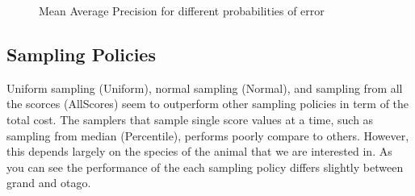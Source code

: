 \begin{figure}[h]
  \centering
  \caption{Mean Average Precision for different probabilities of error}
  \label{fig:overview}
\end{figure}


\subsection{Sampling Policies} %
\label{sub:sampling_policies_res}

Uniform sampling (Uniform), normal sampling (Normal), and sampling from all the scorces (AllScores) seem to outperform other sampling policies in term of the total cost. The samplers that sample single score values at a time, such as sampling from median (Percentile), performs poorly compare to others. However, this depends largely on the species of the animal that we are interested in. As you can see the performance of the each sampling policy differs slightly between grand and otago.

